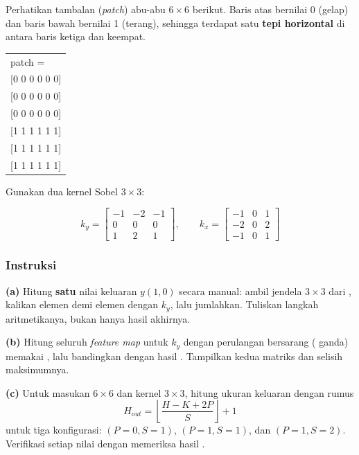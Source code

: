 \documentclass[12pt, a4paper]{article}
\begin{document}
Perhatikan tambalan (\emph{patch}) abu-abu $6 \times 6$ berikut. Baris atas bernilai 0 (gelap) dan baris bawah bernilai 1 (terang), sehingga terdapat satu \textbf{tepi horizontal} di antara baris ketiga dan keempat.

\begin{center}
\ttfamily
\begin{tabular}{@{}l@{}}
patch = \\
{[}0 0 0 0 0 0{]} \\
{[}0 0 0 0 0 0{]} \\
{[}0 0 0 0 0 0{]} \\
{[}1 1 1 1 1 1{]} \\
{[}1 1 1 1 1 1{]} \\
{[}1 1 1 1 1 1{]} \\
\end{tabular}
\end{center}

Gunakan dua kernel Sobel $3 \times 3$:

\begin{equation*}
k_y = \begin{bmatrix} -1 & -2 & -1 \\ 0 & 0 & 0 \\ 1 & 2 & 1 \end{bmatrix},
\qquad
k_x = \begin{bmatrix} -1 & 0 & 1 \\ -2 & 0 & 2 \\ -1 & 0 & 1 \end{bmatrix}
\end{equation*}

\subsubsection{Instruksi}
\label{sec:soal2-instruksi}

\textbf{(a)} Hitung \textbf{satu} nilai keluaran $y(1,0)$ secara manual: ambil jendela $3 \times 3$ dari , kalikan elemen demi elemen dengan $k_y$, lalu jumlahkan. Tuliskan langkah aritmetikanya, bukan hanya hasil akhirnya.

\textbf{(b)} Hitung seluruh \emph{feature map} untuk $k_y$ dengan perulangan bersarang ( ganda) memakai , lalu bandingkan dengan hasil . Tampilkan kedua matriks dan selisih maksimumnya.

\textbf{(c)} Untuk masukan $6 \times 6$ dan kernel $3 \times 3$, hitung ukuran keluaran dengan rumus
\begin{equation*}
H_{out} = \left\lfloor \frac{H - K + 2P}{S} \right\rfloor + 1
\end{equation*}
untuk tiga konfigurasi: $(P{=}0, S{=}1)$, $(P{=}1, S{=}1)$, dan $(P{=}1, S{=}2)$. Verifikasi setiap nilai dengan memeriksa  hasil .
\end{document}
